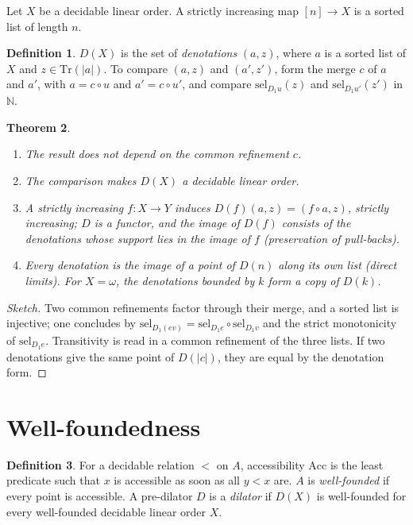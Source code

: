 \documentclass[11pt,a4paper]{article}
\newtheorem{theorem}{Theorem}[section]
\theoremstyle{definition}
\newtheorem{definition}[theorem]{Definition}
\theoremstyle{remark}
\newcommand{\Tr}{\mathrm{Tr}}
\newcommand{\sel}{\mathrm{sel}}
\newcommand{\Acc}{\mathrm{Acc}}
\newcommand{\N}{\mathbb{N}}
\begin{document}
Let $X$ be a decidable linear order. A strictly increasing map
$[n] \to X$ is a sorted list of length $n$.

\begin{definition}
$D(X)$ is the set of \emph{denotations} $(a, z)$, where $a$ is a sorted
list of $X$ and $z \in \Tr(|a|)$. To compare $(a, z)$ and $(a', z')$, form
the merge $c$ of $a$ and $a'$, with $a = c \circ u$ and $a' = c \circ u'$,
and compare $\sel_{D_1 u}(z)$ and $\sel_{D_1 u'}(z')$ in $\N$.
\end{definition}

\begin{theorem}
\begin{enumerate}
\item The result does not depend on the common refinement $c$.
\item The comparison makes $D(X)$ a decidable linear order.
\item A strictly increasing $f : X \to Y$ induces
  $D(f)(a, z) = (f \circ a, z)$, strictly increasing; $D$ is a functor,
  and the image of $D(f)$ consists of the denotations whose support lies
  in the image of $f$ (preservation of pull-backs).
\item Every denotation is the image of a point of $D(n)$ along its own
  list (direct limits). For $X = \omega$, the denotations bounded by $k$
  form a copy of $D(k)$.
\end{enumerate}
\end{theorem}

\begin{proof}[Sketch]
Two common refinements factor through their merge, and a sorted list is
injective; one concludes by $\sel_{D_1(ev)} = \sel_{D_1 e} \circ
\sel_{D_1 v}$ and the strict monotonicity of $\sel_{D_1 e}$. Transitivity
is read in a common refinement of the three lists. If two denotations give
the same point of $D(|c|)$, they are equal by the denotation form.
\end{proof}

\section{Well-foundedness}

\begin{definition}
For a decidable relation $<$ on $A$, accessibility $\Acc$ is the least
predicate such that $x$ is accessible as soon as all $y < x$ are. $A$ is
\emph{well-founded} if every point is accessible. A pre-dilator $D$ is a
\emph{dilator} if $D(X)$ is well-founded for every well-founded decidable
linear order $X$.
\end{definition}
\end{document}
